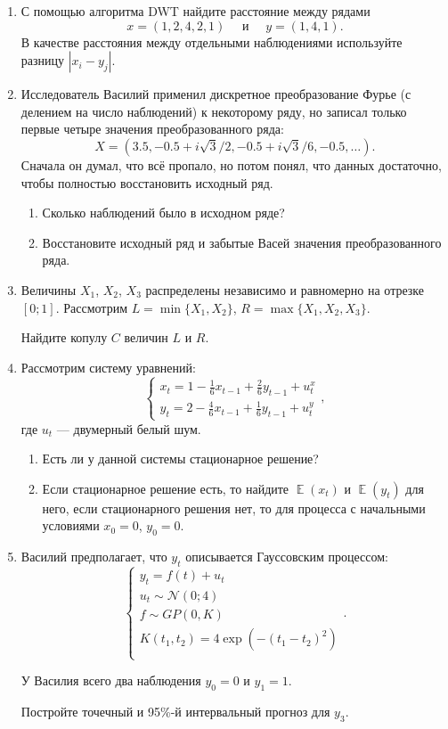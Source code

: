 \documentclass[12pt]{article} %
\DeclareMathOperator{\E}{\mathbb{E}}
\newcommand \cN{\mathcal{N}}
\begin{document}
\begin{enumerate}

    \item С помощью алгоритма DWT найдите расстояние между рядами
    \[
    x = (1, 2, 4, 2, 1) \quad \text{ и } \quad y = (1, 4, 1).    
    \]
    В качестве расстояния между отдельными наблюдениями используйте разницу $|x_i - y_j|$.
    
    \item Исследователь Василий применил дискретное преобразование Фурье (с делением на число наблюдений) к некоторому ряду,
    но записал только первые четыре значения преобразованного ряда:
    \[
    X = (3.5, -0.5 + i\sqrt{3}/2 , -0.5 + i\sqrt{3}/6, -0.5, \ldots).    
    \]
    Сначала он думал, что всё пропало, но потом понял, что данных достаточно, 
    чтобы полностью восстановить исходный ряд.
    
    \begin{enumerate}
        \item Сколько наблюдений было в исходном ряде?
        \item Восстановите исходный ряд и забытые Васей значения преобразованного ряда.
    \end{enumerate}
    
    \item Величины $X_1$, $X_2$, $X_3$ распределены независимо и равномерно на
    отрезке $[0; 1]$. Рассмотрим $L = \min\{X_1, X_2\}$, $R = \max\{X_1, X_2, X_3\}$.
    
    Найдите копулу $C$ величин $L$ и $R$. 

    \item Рассмотрим систему уравнений:
    \[
    \begin{cases}
    x_t = 1 - \frac{1}{6}x_{t-1} + \frac{2}{6}y_{t-1} + u^x_t \\
    y_t = 2 - \frac{4}{6}x_{t-1} + \frac{1}{6}y_{t-1} + u^y_t
    \end{cases},
    \]
    где $u_t$ — двумерный белый шум.
    \begin{enumerate}
    \item Есть ли у данной системы стационарное решение?
    \item Если стационарное решение есть, то найдите $\E(x_t)$ и $\E(y_t)$ для него,
    если стационарного решения нет, то для процесса с начальными условиями $x_0 = 0$, $y_0 = 0$.
    \end{enumerate}
    
    \item Василий предполагает, что $y_t$ описывается Гауссовским процессом:
    \[
    \begin{cases} 
        y_t = f(t) + u_t \\
        u_t \sim \cN(0; 4) \\
        f \sim GP(0, K) \\
        K(t_1, t_2) = 4\exp(-(t_1 - t_2)^2) \\
    \end{cases}.
    \]

    У Василия всего два наблюдения $y_0 = 0$ и $y_1 = 1$. 

    Постройте точечный и 95\%-й интервальный прогноз для $y_3$.

\end{enumerate}
\end{document}
